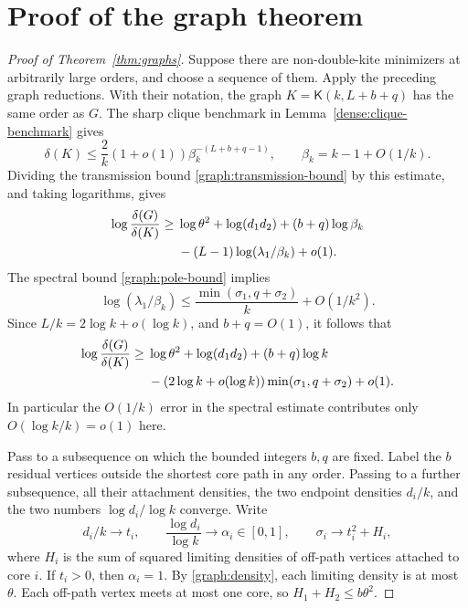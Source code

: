 \documentclass[11pt,a4paper]{article}
\numberwithin{equation}{section}
\theoremstyle{definition}
\theoremstyle{remark}
\newcommand{\Kite}{\mathsf{K}}
\begin{document}
\section{Proof of the graph theorem}\label{sec:graph-conclusion}

\begin{proof}[Proof of Theorem~\ref{thm:graphs}]
Suppose there are non-double-kite minimizers at arbitrarily large
orders, and choose a sequence of them. Apply the preceding graph
reductions. With their notation, the graph
$K=\Kite(k,L+b+q)$ has the same order as $G$. The sharp clique
benchmark in Lemma~\ref{dense:clique-benchmark} gives
\[
 \delta(K)\le\frac2k(1+o(1))\beta_k^{-(L+b+q-1)},
 \qquad\beta_k=k-1+O(1/k).
\]
Dividing the transmission bound \eqref{graph:transmission-bound} by
this estimate, and taking logarithms, gives
\begin{align}
 \log\frac{\delta(G)}{\delta(K)}
 \ge{}&\log\theta^2+\log(d_1d_2)+(b+q)\log\beta_k\notag\\
 &-(L-1)\log(\lambda_1/\beta_k)+o(1).
 \label{graph:comparison-exact}
\end{align}
The spectral bound \eqref{graph:pole-bound} implies
\[
 \log(\lambda_1/\beta_k)
 \le\frac{\min(\sigma_1,q+\sigma_2)}k+O(1/k^2).
\]
Since $L/k=2\log k+o(\log k)$, and $b+q=O(1)$, it follows that
\begin{align}
 \log\frac{\delta(G)}{\delta(K)}
 \ge{}&\log\theta^2+\log(d_1d_2)+(b+q)\log k\notag\\
 &-(2\log k+o(\log k))\min(\sigma_1,q+\sigma_2)+o(1).
 \label{graph:comparison}
\end{align}
In particular the $O(1/k)$ error in the spectral estimate contributes
only $O(\log k/k)=o(1)$ here.

Pass to a subsequence on which the bounded integers $b,q$ are fixed.
Label the $b$ residual vertices outside the shortest core path in any
order. Passing to a further subsequence, all their attachment densities,
the two endpoint densities $d_i/k$, and the two numbers
$\log d_i/\log k$ converge. Write
\[
 d_i/k\to t_i,\qquad \frac{\log d_i}{\log k}\to\alpha_i\in[0,1],
 \qquad \sigma_i\to t_i^2+H_i,
\]
where $H_i$ is the sum of squared limiting densities of off-path
vertices attached to core $i$. If $t_i>0$, then $\alpha_i=1$.
By \eqref{graph:density}, each limiting density is at most $\theta$.
Each off-path vertex meets at most one core, so
$H_1+H_2\le b\theta^2$.


\end{proof}
\end{document}
